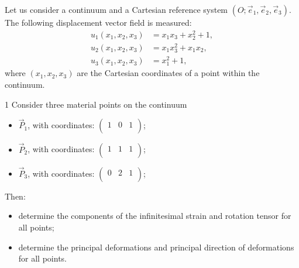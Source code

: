 \newcommand{\NoteType}{Assignment 2: State of Strain}
\newcommand{\TheDate}{April 5, 2026}


  
  \newpage

  \begin{probdef}
    Let us consider a continuum and a Cartesian reference system $(O; \Vec{e}_1, \Vec{e}_2, \Vec{e}_3)$.
    The following displacement vector field is measured:
    \begin{equation}
      \begin{aligned}
        u_1(x_1, x_2, x_3) &= x_1x_3 + x_2^2 + 1, \\
        u_2(x_1, x_2, x_3) &= x_1 x_3^2 + x_1 x_2, \\
        u_3(x_1, x_2, x_3) &= x_1^2 + 1,
      \end{aligned}
    \end{equation}
    where $(x_1, x_2, x_3)$ are the Cartesian coordinates of a point within the continuum.
  \end{probdef}

  \begin{problem}{1}
    Consider three material points on the continuum
    \begin{itemize}
      \item $\Vec{P}_1$, with coordinates: $\begin{pmatrix}
        1 & 0 & 1\\
      \end{pmatrix}$;
      \item $\Vec{P}_2$, with coordinates: $\begin{pmatrix}
        1 & 1 & 1\\
      \end{pmatrix}$;
      \item $\Vec{P}_3$, with coordinates: $\begin{pmatrix}
        0 & 2 & 1\\
      \end{pmatrix}$;
    \end{itemize}
    Then:
    \begin{itemize}
      \item determine the components of the infinitesimal strain and rotation tensor for all points;
      \item determine the principal deformations and principal direction of deformations for all points.
    \end{itemize}
  \end{problem}

